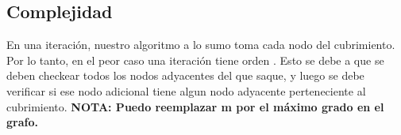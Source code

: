 \subsection{Complejidad}

En una iteración, nuestro algoritmo a lo sumo toma cada nodo del cubrimiento. Por lo tanto, en el peor caso una iteración tiene orden . Esto se debe a que se deben checkear todos los nodos adyacentes del que saque, y luego se debe verificar si ese nodo adicional tiene algun nodo adyacente perteneciente al cubrimiento. 
\textbf{NOTA: Puedo reemplazar m por el máximo grado en el grafo.}
